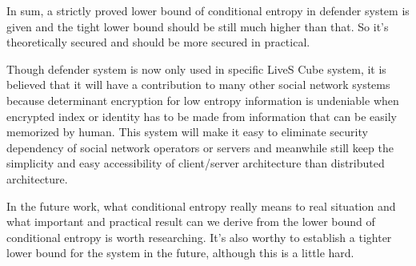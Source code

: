 \documentclass[10pt,a4paper]{article}
\begin{document}
	In sum, a strictly proved lower bound of conditional entropy
	in defender system is given
	and the tight lower bound should be still much higher than that.
	So it's theoretically secured and should be more secured in practical.	
	
	Though defender system is now only used in specific LiveS Cube system,
	it is believed that it will have a contribution to many other social
	network systems because determinant encryption for low entropy
	information is undeniable when encrypted index or identity has to be made
	from information that can be easily memorized by human. This system will
	make it easy to eliminate security dependency of social network operators
	or servers
	and meanwhile still keep the simplicity and easy accessibility of
	client/server architecture than distributed architecture.
	
	In the future work, what conditional entropy really means to
	real situation and what important and practical
	result can we derive from the lower bound of
	conditional entropy is worth researching.
	It's also worthy to establish a tighter lower bound
	for the system in the future, although this is
	a little hard.
		
\end{document}
